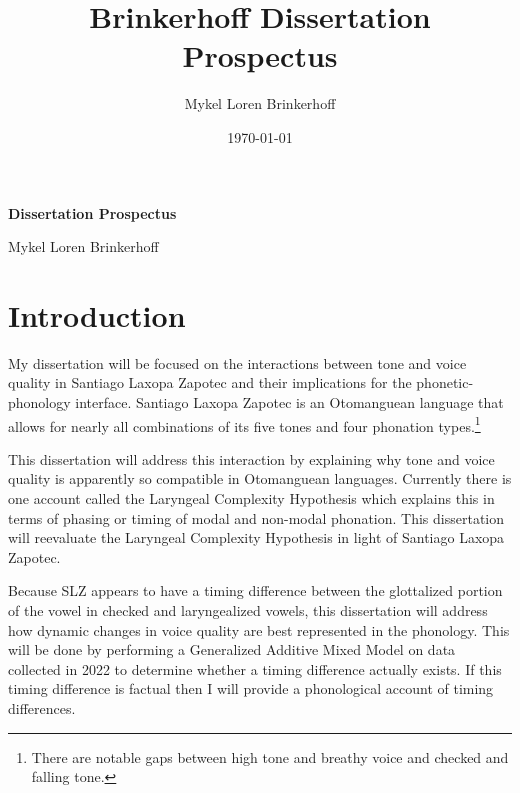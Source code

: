\documentclass[12pt, letterpaper]{article}
\title{Brinkerhoff Dissertation Prospectus}
\author{Mykel Loren Brinkerhoff}
\date{\today}
\begin{document}

\onehalfspacing

\begin{center}
    {\Large \textbf{Dissertation Prospectus}}
    \vspace{6pt}

    Mykel Loren Brinkerhoff
\end{center}
\thispagestyle{fancy}


\section{Introduction} \label{sec:Introduction}

My dissertation will be focused on the interactions between tone and voice quality in Santiago Laxopa Zapotec and their implications for the phonetic-phonology interface. Santiago Laxopa Zapotec is an Otomanguean language that allows for nearly all combinations of its five tones and four phonation types.\footnote{There are notable gaps between high tone and breathy voice and checked and falling tone.} 

This dissertation will address this interaction by explaining why tone and voice quality is apparently so compatible in Otomanguean languages. Currently there is one account called the Laryngeal Complexity Hypothesis \citep{silvermanLaryngealComplexityOtomanguean1997,silvermanPhasingRecoverability1997,blankenshipTimeCourseBreathiness1997,blankenshipTimingNonmodalPhonation2002} which explains this in terms of phasing or timing of modal and non-modal phonation. This dissertation will reevaluate the Laryngeal Complexity Hypothesis in light of Santiago Laxopa Zapotec. 

Because SLZ appears to have a timing difference between the glottalized portion of the vowel in checked and laryngealized vowels, this dissertation will address how dynamic changes in voice quality are best represented in the phonology. This will be done by performing a Generalized Additive Mixed Model on data collected in 2022 to determine whether a timing difference actually exists. If this timing difference is factual then I will provide a phonological account of timing differences. 
\end{document}
